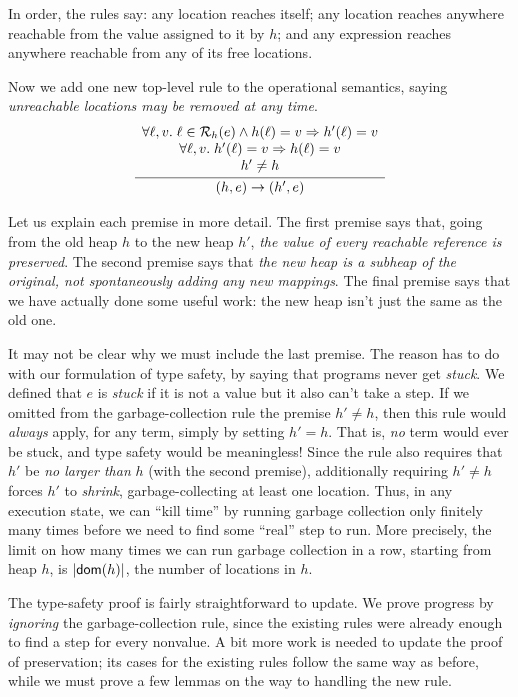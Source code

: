 \documentclass{amsbook}
\theoremstyle{definition}
\theoremstyle{remark}
\numberwithin{section}{chapter}
\numberwithin{equation}{chapter}
\begin{document}
In order, the rules say: any location reaches itself; any location reaches anywhere reachable from the value assigned to it by $h$; and any expression reaches anywhere reachable from any of its free locations.

Now we add one new top-level rule to the operational semantics, saying \emph{unreachable locations may be removed at any time}.
$$\infer{\smallstep{(h, e)}{(h', e)}}{
  \begin{array}{c}
    \forall \ell, v. \; \ell \in \reach{h}{e} \land \msel{h}{\ell} = v \Rightarrow \msel{h'}{\ell} = v \\
    \forall \ell, v. \; \msel{h'}{\ell} = v \Rightarrow \msel{h}{\ell} = v \\
    h' \neq h
  \end{array}
}$$

Let us explain each premise in more detail.
The first premise says that, going from the old heap $h$ to the new heap $h'$, \emph{the value of every reachable reference is preserved}.
The second premise says that \emph{the new heap is a subheap of the original, not spontaneously adding any new mappings}.
The final premise says that we have actually done some useful work: the new heap isn't just the same as the old one.

It may not be clear why we must include the last premise.
The reason has to do with our formulation of type safety, by saying that programs never get \emph{stuck}.
We defined that $e$ is \emph{stuck} if it is not a value but it also can't take a step.
If we omitted from the garbage-collection rule the premise $h' \neq h$, then this rule would \emph{always} apply, for any term, simply by setting $h' = h$.
That is, \emph{no} term would ever be stuck, and type safety would be meaningless!
Since the rule also requires that $h'$ be \emph{no larger than} $h$ (with the second premise), additionally requiring $h' \neq h$ forces $h'$ to \emph{shrink}, garbage-collecting at least one location.
Thus, in any execution state, we can ``kill time'' by running garbage collection only finitely many times before we need to find some ``real'' step to run.
More precisely, the limit on how many times we can run garbage collection in a row, starting from heap $h$, is $|\mathsf{dom}(h)|$, the number of locations in $h$.

The type-safety proof is fairly straightforward to update.
We prove progress by \emph{ignoring} the garbage-collection rule, since the existing rules were already enough to find a step for every nonvalue.
A bit more work is needed to update the proof of preservation; its cases for the existing rules follow the same way as before, while we must prove a few lemmas on the way to handling the new rule.
\end{document}
